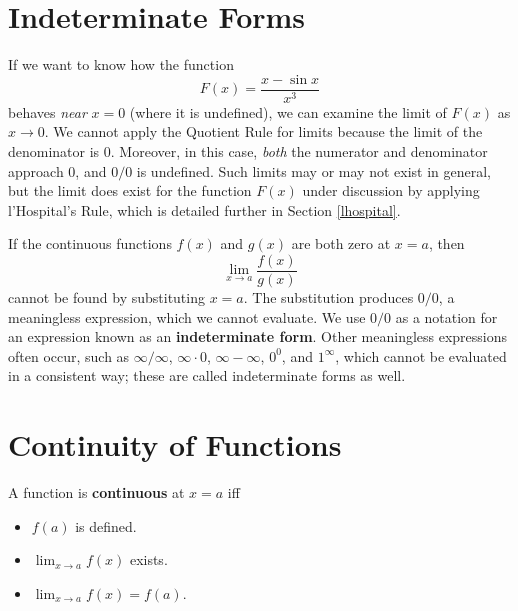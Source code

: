 \section{Indeterminate Forms}

If we want to know how the function
$$F(x)=\frac{x-\sin x}{x^3}$$
behaves \emph{near} $x=0$ (where it is undefined), we can examine the limit of $F(x)$ as $x \to 0$. We cannot apply the Quotient Rule for limits because the limit of the denominator is $0$. Moreover, in this case, \emph{both} the numerator and denominator approach $0$, and $0/0$ is undefined. Such limits may or may not exist in general, but the limit does exist for the function $F(x)$ under discussion by applying l'Hospital's Rule, which is detailed further in Section \ref{lhospital}.

If the continuous functions $f(x)$ and $g(x)$ are both zero at $x=a$, then
$$\lim_{x \to a} \frac{f(x)}{g(x)}$$
cannot be found by substituting $x=a$. The substitution produces $0/0$, a meaningless expression, which we cannot evaluate. We use $0/0$ as a notation for an expression known as an \textbf{indeterminate form}. Other meaningless expressions often occur, such as $\infty / \infty$, $\infty \cdot 0$, $\infty - \infty$, $0^0$, and $1^{\infty}$, which cannot be evaluated in a consistent way; these are called indeterminate forms as well.

\section{Continuity of Functions}
\begin{defn}
  A function is \textbf{continuous} at $x=a$ iff
  \begin{itemize}
    \item $f(a)$ is defined.
    \item $\lim_{x\to a} f(x)$ exists.
    \item $\lim_{x\to a} f(x)=f(a)$.
  \end{itemize}
\end{defn}
